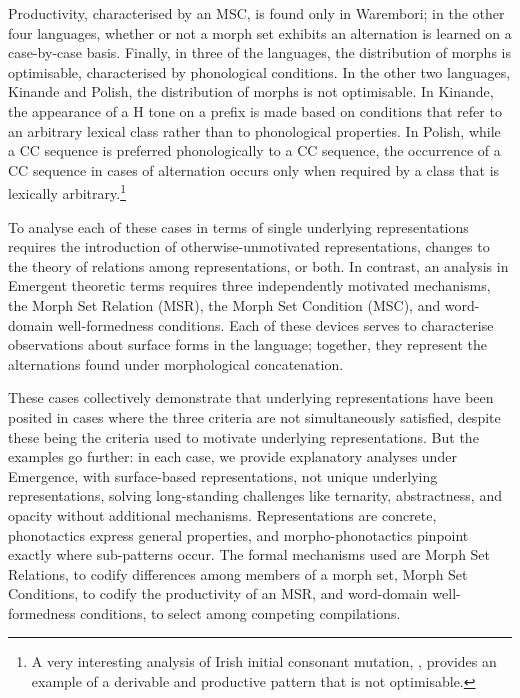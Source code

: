 Productivity, characterised by an MSC, is found only in Warembori; in the other four languages, whether or not a morph set exhibits an alternation is learned on a case-by-case basis. Finally, in three of the languages, the distribution of morphs is optimisable, characterised by phonological conditions. In the other two languages, Kinande and Polish, the distribution of morphs is not optimisable. In Kinande, the appearance of a H tone on a prefix is made based on conditions that refer to an arbitrary lexical class rather than to phonological properties. In Polish, while a CC sequence is preferred phonologically to a CC sequence, the occurrence of a CC sequence in cases of alternation occurs only when required by a class that is lexically arbitrary.\footnote{A very interesting analysis of Irish initial consonant mutation, \citet{McCullough:2020, McCullough:2021}, provides an example of a derivable and productive pattern that is not optimisable.}

To analyse each of these cases in terms of single underlying representations requires the introduction of otherwise-unmotivated representations, changes to the theory of relations among representations, or both. In contrast, an analysis in Emergent theoretic terms requires three independently motivated mechanisms, the Morph Set Relation (MSR), the Morph Set Condition (MSC), and word-domain well-formedness conditions.  Each of these devices serves to characterise observations about surface forms in the language; together, they represent the alternations found under morphological concatenation.

These cases collectively demonstrate that underlying representations have been posited in cases where the three criteria are not simultaneously satisfied, despite these being the criteria used to motivate underlying representations. But the examples go further: in each case, we provide explanatory analyses under Emergence, with surface-based representations, not unique underlying representations, solving long-standing challenges like ternarity, abstractness, and opacity without additional mechanisms. Representations are concrete,  phonotactics express general properties, and morpho-phonotactics pinpoint exactly where sub-patterns occur. The formal mechanisms used are Morph Set Relations, to codify differences among members of a morph set, Morph Set Conditions, to codify the productivity of an MSR, and word-domain well-formedness conditions, to select among competing compilations.  
